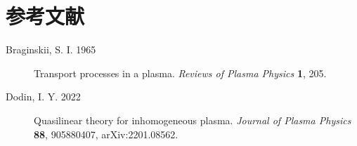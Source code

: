 \section*{参考文献}
\begin{description}
\item[Braginskii, S. I. 1965] Transport processes in a plasma. \emph{Reviews of Plasma Physics} \textbf{1}, 205.
\item[Dodin, I. Y. 2022] Quasilinear theory for inhomogeneous plasma. \emph{Journal of Plasma Physics} \textbf{88}, 905880407, arXiv:2201.08562.
\end{description}
